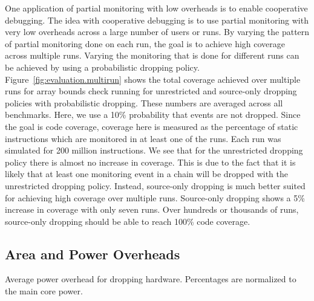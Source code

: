 One application of partial monitoring with low overheads is to enable
cooperative debugging. 
The idea with cooperative debugging is to use partial
monitoring with very low overheads across a large number of users or runs. By
varying the pattern of partial monitoring done on each run, the goal is to
achieve high coverage across multiple runs. Varying the monitoring that is
done for different runs can be achieved by using a probabilistic dropping policy.
Figure~\ref{fig:evaluation.multirun} shows the total
coverage achieved over multiple runs for array bounds check running for
unrestricted and source-only dropping policies with probabilistic dropping.
These numbers are averaged across all benchmarks. Here, we use a 10\%
probability
that events are not dropped. Since the goal is code coverage, coverage here is
measured as the percentage of static instructions which are monitored in at
least one of the runs. Each run
was simulated for 200 million instructions. 
We see that for the unrestricted dropping policy there is almost no increase in
coverage.  This is due to the fact that it is likely that at least one
monitoring event in a chain will be dropped with the unrestricted dropping
policy. 
Instead, source-only
dropping is much better suited for achieving high coverage over multiple runs.
Source-only dropping shows a 5\% increase in coverage with only seven runs.
Over hundreds or thousands of runs, source-only dropping should be able to
reach 100\% code coverage.

\subsection{Area and Power Overheads}

\begin{table}[tb]
  \begin{center}
    \vspace{-0.0in}
    \begin{footnotesize}
    
    \end{footnotesize}
    \caption{Average power overhead for dropping hardware. Percentages 
    are normalized to the main core power.}
    \vspace{-0.2in}
    \label{tab:evaluation.area_power}
  \end{center}
\end{table}


